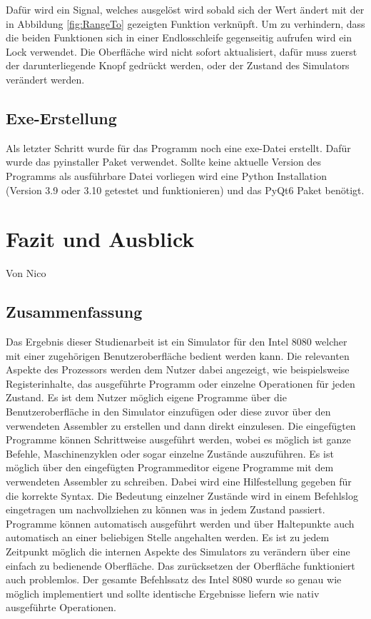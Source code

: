 \documentclass[12pt]{article}
\begin{document}
\noindent
Dafür wird ein Signal, welches ausgelöst wird sobald sich der Wert ändert mit der in Abbildung \ref{fig:RangeTo} gezeigten Funktion verknüpft. Um zu verhindern, dass die beiden Funktionen sich in einer Endlosschleife gegenseitig aufrufen wird ein Lock verwendet. Die Oberfläche wird nicht sofort aktualisiert, dafür muss zuerst der darunterliegende Knopf gedrückt werden, oder der Zustand des Simulators verändert werden.

\subsection{Exe-Erstellung}
Als letzter Schritt wurde für das Programm noch eine \glqq exe\grqq-Datei erstellt. Dafür wurde das \glqq pyinstaller\grqq  \cite{pyinstaller} Paket verwendet. Sollte keine aktuelle Version des Programms als ausführbare Datei vorliegen wird eine Python Installation (Version 3.9 oder 3.10 getestet und funktionieren) und das PyQt6 Paket \cite{qt} benötigt.

\newpage

\section{Fazit und Ausblick}
Von Nico \\

\noindent
\subsection{Zusammenfassung}
Das Ergebnis dieser Studienarbeit ist ein Simulator für den Intel 8080 welcher mit einer zugehörigen Benutzeroberfläche bedient werden kann. Die relevanten Aspekte des Prozessors werden dem Nutzer dabei angezeigt, wie beispielsweise Registerinhalte, das ausgeführte Programm oder einzelne Operationen für jeden Zustand. Es ist dem Nutzer möglich eigene Programme über die Benutzeroberfläche in den Simulator einzufügen oder diese zuvor über den verwendeten Assembler zu erstellen und dann direkt einzulesen. Die eingefügten Programme können Schrittweise ausgeführt werden, wobei es möglich ist ganze Befehle, Maschinenzyklen oder sogar einzelne Zustände auszuführen. Es ist möglich über den eingefügten Programmeditor eigene Programme mit dem verwendeten Assembler zu schreiben. Dabei wird eine Hilfestellung gegeben für die korrekte Syntax. Die Bedeutung einzelner Zustände wird in einem Befehlslog eingetragen um nachvollziehen zu können was in jedem Zustand passiert. Programme können automatisch ausgeführt werden und über Haltepunkte auch automatisch an einer beliebigen Stelle angehalten werden. Es ist zu jedem Zeitpunkt möglich die internen Aspekte des Simulators zu verändern über eine einfach zu bedienende Oberfläche. Das zurücksetzen der Oberfläche funktioniert auch problemlos. Der gesamte Befehlssatz des Intel 8080 wurde so genau wie möglich implementiert und sollte identische Ergebnisse liefern wie nativ ausgeführte Operationen.
\end{document}
